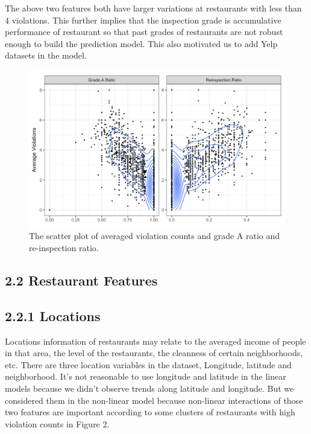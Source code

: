 \documentclass[letterpaper, 11 pt, conference]{ieeeconf}
\begin{document}
The above two features both have larger variations at restaurants with less than 4 violations. This further implies that the inspection grade is accumulative performance of restaurant so that past grades of restaurants are not robust enough to build the prediction model. This also motivated us to add Yelp datasets in the model. 

\begin{figure}[h]
	\centering
    \includegraphics[scale = 0.28]{grade_reinsp}
    \caption{The scatter plot of averaged violation counts and grade A ratio and re-inspection ratio.}
\end{figure}

\subsection*{2.2 Restaurant Features}

\subsection*{2.2.1 Locations}

Locations information of restaurants may relate to the averaged income of people in that area, the level of the restaurants, the cleanness of certain neighborhoods, etc. There are three location variables in the dataset, Longitude, latitude and neighborhood. It's not reasonable to use longitude and latitude in the linear models because we didn't observe trends along latitude and longitude. But we considered them in the non-linear model because non-linear interactions of those two features are important according to some clusters of restaurants with high violation counts in Figure 2. 
\end{document}
